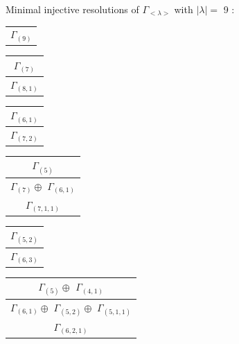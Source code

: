 \documentclass[main.tex]{subfiles}
\begin{document}
\bigskip
Minimal injective resolutions of $\Gamma_{<\lambda>}$ with $|\lambda| = $ 9 : \\
\begin{minipage}{.2\textwidth}
\centering
\begin{tabular}{c}
$\Gamma_{(
9
)}$
\\
\end{tabular}\end{minipage}
\begin{minipage}{.2\textwidth}
\centering
\begin{tabular}{c}
$\Gamma_{(
7
)}$
\\ \hline
$\Gamma_{(
8 , 
1
)}$
\\
\end{tabular}\end{minipage}
\begin{minipage}{.2\textwidth}
\centering
\begin{tabular}{c}
$\Gamma_{(
6 , 
1
)}$
\\ \hline
$\Gamma_{(
7 , 
2
)}$
\\
\end{tabular}\end{minipage}
\begin{minipage}{.2\textwidth}
\centering
\begin{tabular}{c}
$\Gamma_{(
5
)}$
\\ \hline
$\Gamma_{(
7
)} \oplus$
$\Gamma_{(
6 , 
1
)}$
\\ \hline
$\Gamma_{(
7 , 
1 , 
1
)}$
\\
\end{tabular}\end{minipage}
\begin{minipage}{.2\textwidth}
\centering
\begin{tabular}{c}
$\Gamma_{(
5 , 
2
)}$
\\ \hline
$\Gamma_{(
6 , 
3
)}$
\\
\end{tabular}\end{minipage}
\bigskip
\begin{minipage}{.3\textwidth}
\centering
\begin{tabular}{c}
$\Gamma_{(
5
)} \oplus$
$\Gamma_{(
4 , 
1
)}$
\\ \hline
$\Gamma_{(
6 , 
1
)} \oplus$
$\Gamma_{(
5 , 
2
)} \oplus$
$\Gamma_{(
5 , 
1 , 
1
)}$
\\ \hline
$\Gamma_{(
6 , 
2 , 
1
)}$
\\
\end{tabular}\end{minipage}
\end{document}
